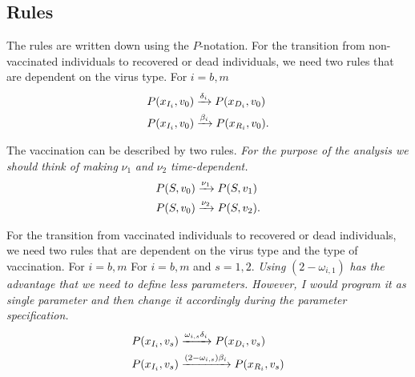 \subsection{Rules}
The rules are written down using the $P$-notation. For the transition from non-vaccinated individuals to recovered or dead individuals, we need two rules that are dependent on the virus type. For $i = b,m$
\begin{align}
    P(x_{I_i},  v_0) &\xrightarrow{\delta_i} P(x_{D_i}, v_0) \\
    P(x_{I_i},  v_0) &\xrightarrow{\beta_i} P(x_{R_i},  v_0).\notag
\end{align}

The vaccination can be described by two rules. \textit{For the purpose of the analysis we should think of making} $\nu_1$ \textit{and} $\nu_2$ \textit{time-dependent.}
\begin{align}
    P(S, v_0) &\xrightarrow{\nu_1} P(S, v_1) \\
    P(S, v_0) &\xrightarrow{\nu_2} P(S, v_2).\notag
\end{align}

For the transition from vaccinated individuals to recovered or dead individuals, we need two rules that are dependent on the virus type and the type of vaccination. For $i = b,m$ For $i = b,m$ and $s = 1,2$. \textit{Using} $(2-\omega_{i,1})$ \textit{has the advantage that we need to define less parameters. However, I would program it as single parameter and then change it accordingly during the parameter specification.}
\begin{align}
    P(x_{I_i},  v_s) &\xrightarrow{\omega_{i,s} \delta_i} P(x_{D_i}, v_s) \\
    P(x_{I_i}, v_s) &\xrightarrow{(2-\omega_{i,s})\beta_i} P(x_{R_i}, v_s)\notag
\end{align}

